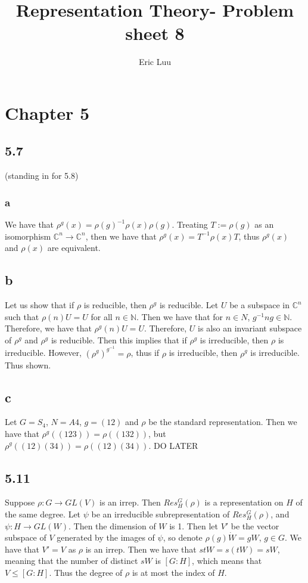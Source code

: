 \documentclass[]{article}
\title{Representation Theory- Problem sheet 8}
\author{Eric Luu}
\begin{document}
\maketitle

\section*{Chapter 5}
\subsection*{5.7} (standing in for 5.8)

\subsubsection*{a}
We have that $\rho^g(x) = \rho(g)^{-1} \rho(x) \rho(g)$. Treating $T := \rho(g)$ as an isomorphism $\mathbb{C}^n \rightarrow \mathbb{C}^n$, then we have that $\rho^g(x) = T^{-1} \rho(x) T$, thus $\rho^g(x)$ and $\rho(x)$ are equivalent. 

\subsection*{b}
Let us show that if $\rho$ is reducible, then $\rho^g$ is reducible. Let $U$ be a subspace in $\mathbb{C}^n$ such that $\rho(n) U = U$ for all $n \in \mathbb{N}$. Then we have that for $n \in N$, $g^{-1} n g \in \mathbb{N}$. Therefore, we have that $\rho^g(n) U = U$. Therefore, $U$ is also an invariant subspace of $\rho^g$ and $\rho^g$ is reducible. Then this implies that if $\rho^g$ is irreducible, then $\rho$ is irreducible. However, $\left(\rho^g\right)^{g^{-1}} = \rho$, thus if $\rho$ is irreducible, then $\rho^g$ is irreducible. Thus shown. 
\subsection*{c}
Let $G = S_4$, $N = A4$, $g = (12)$ and $\rho$ be the standard representation. Then we have that $\rho^g((123)) = \rho((132))$, but $\rho^g((12)(34)) = \rho((12)(34))$. DO LATER

\subsection*{5.11}
Suppose $\rho: G \rightarrow GL(V)$ is an irrep. Then $Res^G_H(\rho)$ is a representation on $H$ of the same degree. Let $\psi$ be an irreducible subrepresentation of $Res^G_H(\rho)$, and $\psi: H \rightarrow GL(W)$. Then the dimension of $W$ is 1. Then let $V'$ be the vector subspace of $V$ generated by the images of $\psi$, so denote $\rho(g) \dot W = gW$, $g \in G$. We have that $V' = V$ as $\rho$ is an irrep. Then we have that $stW = s (tW) = sW$, meaning that the number of distinct $sW$ is $[G : H]$, which means that $V \leq [G : H]$. Thus the degree of $\rho$ is at most the index of $H$. 
\end{document}

